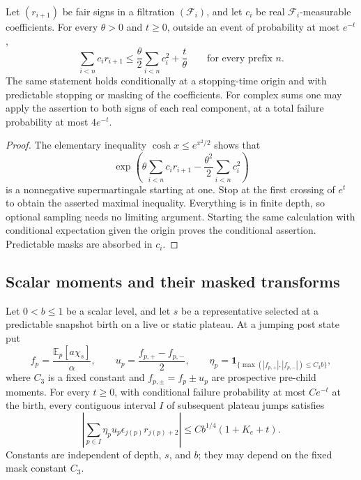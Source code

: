 \begin{lemma}
\label{lemma:paths-sign}
Let $(r_{i+1})$ be fair signs in a filtration $(\mathcal F_i)$, and let
$c_i$ be real $\mathcal F_i$-measurable coefficients.  For every $\theta>0$
and $t\ge0$, outside an event of probability at most $e^{-t}$,
\[
 \sum_{i<n}c_i r_{i+1}
 \le \frac{\theta}{2}\sum_{i<n}c_i^2+\frac{t}{\theta}
 \qquad\text{for every prefix }n.
\]
The same statement holds conditionally at a stopping-time origin and with
predictable stopping or masking of the coefficients.  For complex sums one
may apply the assertion to both signs of each real component, at a total
failure probability at most $4e^{-t}$.
\end{lemma}

\begin{proof}
The elementary inequality $\cosh x\le e^{x^2/2}$ shows that
\[
 \exp\left(\theta\sum_{i<n}c_i r_{i+1}
                  -\frac{\theta^2}{2}\sum_{i<n}c_i^2\right)
\]
is a nonnegative supermartingale starting at one.  Stop at the first
crossing of $e^t$ to obtain the asserted maximal inequality.  Everything
is in finite depth, so optional sampling needs no limiting argument.
Starting the same calculation with conditional expectation given the
origin proves the conditional assertion.  Predictable masks are absorbed
in $c_i$.
\end{proof}

\subsection{Scalar moments and their masked transforms}

\begin{proposition}
\label{prop:scalar-path}
Let $0<b\le1$ be a scalar level, and let $s$ be a representative selected at
a predictable snapshot birth on a live or static plateau.  At a jumping
post state put
\[
 f_p=\frac{\mathbb E_p[a\chi_s]}{\alpha},\qquad
 u_p=\frac{f_{p,+}-f_{p,-}}2,\qquad
 \eta_p=\mathbf1_{\{\max(|f_{p,+}|,|f_{p,-}|)\le C_3b\}},
\]
where $C_3$ is a fixed constant and $f_{p,\pm}=f_p\pm u_p$ are prospective
pre-child moments.  For every $t\ge0$, with conditional failure probability
at most $Ce^{-t}$ at the birth, every contiguous interval $I$ of subsequent
plateau jumps satisfies
\begin{equation}
 \left|\sum_{p\in I}\eta_p u_p\epsilon_{j(p)}r_{j(p)+2}\right|
 \le C b^{1/4}(1+K_e+t).
 \label{eq:source-15}
\end{equation}
Constants are independent of depth, $s$, and $b$; they may depend on the
fixed mask constant $C_3$.
\end{proposition}

